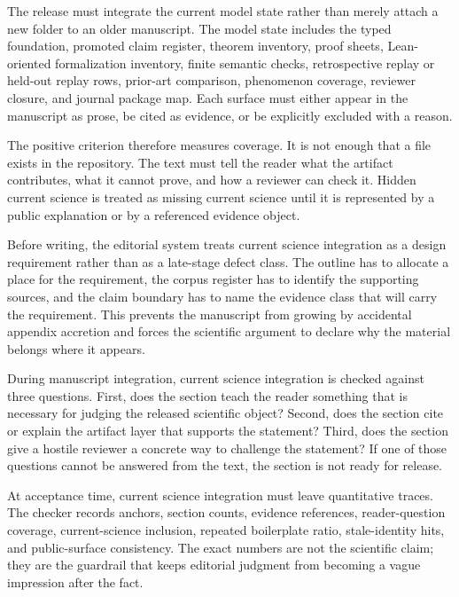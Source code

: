 The release must integrate the current model state rather than merely attach a new folder to an older manuscript. The model state includes the typed foundation, promoted claim register, theorem inventory, proof sheets, Lean-oriented formalization inventory, finite semantic checks, retrospective replay or held-out replay rows, prior-art comparison, phenomenon coverage, reviewer closure, and journal package map. Each surface must either appear in the manuscript as prose, be cited as evidence, or be explicitly excluded with a reason.


The positive criterion therefore measures coverage. It is not enough that a file exists in the repository. The text must tell the reader what the artifact contributes, what it cannot prove, and how a reviewer can check it. Hidden current science is treated as missing current science until it is represented by a public explanation or by a referenced evidence object.


Before writing, the editorial system treats current science integration as a design requirement rather than as a late-stage defect class. The outline has to allocate a place for the requirement, the corpus register has to identify the supporting sources, and the claim boundary has to name the evidence class that will carry the requirement. This prevents the manuscript from growing by accidental appendix accretion and forces the scientific argument to declare why the material belongs where it appears.


During manuscript integration, current science integration is checked against three questions. First, does the section teach the reader something that is necessary for judging the released scientific object? Second, does the section cite or explain the artifact layer that supports the statement? Third, does the section give a hostile reviewer a concrete way to challenge the statement? If one of those questions cannot be answered from the text, the section is not ready for release.


At acceptance time, current science integration must leave quantitative traces. The checker records anchors, section counts, evidence references, reader-question coverage, current-science inclusion, repeated boilerplate ratio, stale-identity hits, and public-surface consistency. The exact numbers are not the scientific claim; they are the guardrail that keeps editorial judgment from becoming a vague impression after the fact.


